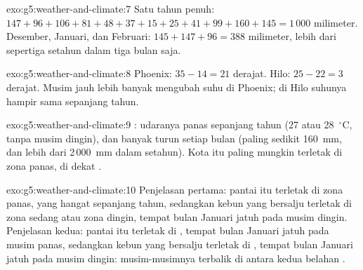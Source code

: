 \begin{solution}{exo:g5:weather-and-climate:7}
Satu tahun penuh: $147 + 96 + 106 + 81 + 48 + 37 + 15 + 25 + 41 + 99 + 160 + 145
= 1\,000$ milimeter. Desember, Januari, dan Februari:
$145 + 147 + 96 = 388$ milimeter, lebih dari sepertiga  setahun dalam
tiga bulan saja.
\end{solution}

\begin{solution}{exo:g5:weather-and-climate:8}
Phoenix: $35 - 14 = 21$ derajat. Hilo: $25 - 22 = 3$ derajat. Musim jauh
lebih banyak mengubah suhu di Phoenix; di Hilo suhunya hampir sama
sepanjang tahun.
\end{solution}

\begin{solution}{exo:g5:weather-and-climate:9}
 : udaranya panas sepanjang tahun (27 atau 28~$^\circ$C,
tanpa musim dingin), dan banyak  turun setiap bulan (paling sedikit
160~mm, dan lebih dari 2\,000~mm dalam setahun). Kota itu paling mungkin
terletak di zona panas, di dekat .
\end{solution}

\begin{solution}{exo:g5:weather-and-climate:10}
Penjelasan pertama: pantai itu terletak di zona panas, yang hangat
sepanjang tahun, sedangkan kebun yang bersalju terletak di zona sedang atau
zona dingin, tempat bulan Januari jatuh pada musim dingin. Penjelasan
kedua: pantai itu terletak di , tempat bulan Januari
jatuh pada musim panas, sedangkan kebun yang bersalju terletak di , tempat bulan Januari jatuh pada musim dingin: musim-musimnya
terbalik di antara kedua belahan .
\end{solution}


